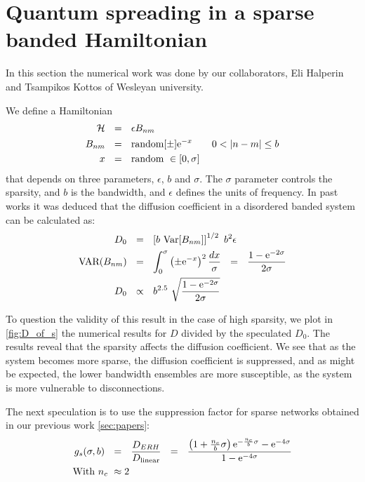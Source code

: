 
\section{Quantum spreading in a sparse banded Hamiltonian}\label{sec:dts}

In this section the numerical work was done by our collaborators,
Eli Halperin and Tsampikos Kottos of Wesleyan university.


We define a Hamiltonian
\begin{align}
\mathcal{H}\ \ &=\ \ \epsilon B_{nm}\\
B_{nm} \ \ &= \ \ \textrm{random}[\pm]\eexp{-x}\qquad 0<|n-m| \le b \\
x \ \ &= \ \ \textrm{random} \ \in [0,\sigma]
\end{align}
that depends on three parameters, $\epsilon$, $b$ and $\sigma$. The $\sigma$
parameter controls the sparsity, and $b$ is the bandwidth, and $\epsilon$
defines the units of frequency.
In past works \cite{cohen_wave_2000,stotland_random-matrix_2010} it was deduced that the diffusion coefficient 
in a disordered banded system can be calculated as:
\begin{align}
D_0 \ \ &=\ \ \left[b\ \textrm{Var}[B_{nm}]\right]^{1/2}\ b^2\epsilon \\
\textrm{VAR}(B_{nm}) \ \ &=\ \ \int_0^\sigma \left(\pm \eexp{-x}\right)^2 \frac{dx}{\sigma}\ \ 
 =\ \  \frac{1-\eexp{-2\sigma}}{2\sigma} \\
 D_0\ \ &\propto\ \ b^{2.5}\ \sqrt{\frac{1-\eexp{-2\sigma}}{2\sigma}} 
\end{align}

To question the validity of this result in the case of high sparsity,
we plot in \autoref{fig:D_of_s} the numerical results for $D$ divided by 
the speculated $D_0$. The results reveal that the sparsity affects the diffusion coefficient.
We see that as the system becomes more sparse, the diffusion coefficient is suppressed,
and as might be expected, the lower bandwidth ensembles are more
susceptible, as the system is more vulnerable to disconnections.


The next speculation is to use the suppression factor for sparse networks 
obtained in our previous work \autoref{sec:papers}:
%
\begin{align}
g_s(\sigma, b)\ \ &=\ \ \frac{D_{ERH}}{D_{\textrm{linear}}}\ \ =\ \ 
\frac{  \left(1+\frac{n_c}{b}\sigma\right)\eexp{-\frac{n_c}{b}\sigma}
                                              - \eexp{-4\sigma}}{1-\eexp{-4\sigma}}\\
\textrm{With } n_c\ &\approx 2
\end{align}

